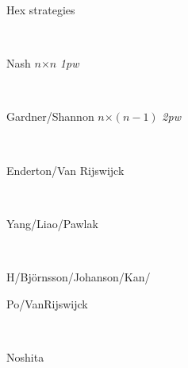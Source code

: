 \noindent
Hex strategies

\

\bitz
\item [48] Nash \hf $n$$\times$$n$ {\it 1pw}

\ 

\item [57] Gardner/Shannon \hf $n$$\times$$(n-1)$ {\it 2pw}

\ 

\item [95/00] Enderton/Van Rijswijck 

\ 

\item [01-03] Yang/Liao/Pawlak 

\ 

\item [03] H/Bj\"{o}rnsson/Johanson/Kan/

	Po/VanRijswijck 

\
 
\item [04] Noshita 
\eitz
